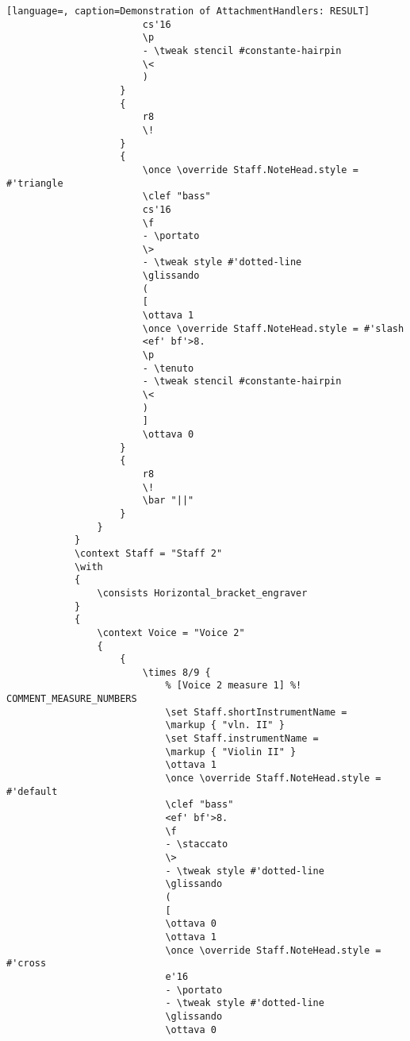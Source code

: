 \begin{lstlisting}[language=, caption=Demonstration of AttachmentHandlers: RESULT]
                        cs'16
                        \p
                        - \tweak stencil #constante-hairpin
                        \<
                        )
                    }
                    {
                        r8
                        \!
                    }
                    {
                        \once \override Staff.NoteHead.style = #'triangle
                        \clef "bass"
                        cs'16
                        \f
                        - \portato
                        \>
                        - \tweak style #'dotted-line
                        \glissando
                        (
                        [
                        \ottava 1
                        \once \override Staff.NoteHead.style = #'slash
                        <ef' bf'>8.
                        \p
                        - \tenuto
                        - \tweak stencil #constante-hairpin
                        \<
                        )
                        ]
                        \ottava 0
                    }
                    {
                        r8
                        \!
                        \bar "||"
                    }
                }
            }
            \context Staff = "Staff 2"
            \with
            {
                \consists Horizontal_bracket_engraver
            }
            {
                \context Voice = "Voice 2"
                {
                    {
                        \times 8/9 {
                            % [Voice 2 measure 1] %! COMMENT_MEASURE_NUMBERS
                            \set Staff.shortInstrumentName =
                            \markup { "vln. II" }
                            \set Staff.instrumentName =
                            \markup { "Violin II" }
                            \ottava 1
                            \once \override Staff.NoteHead.style = #'default
                            \clef "bass"
                            <ef' bf'>8.
                            \f
                            - \staccato
                            \>
                            - \tweak style #'dotted-line
                            \glissando
                            (
                            [
                            \ottava 0
                            \ottava 1
                            \once \override Staff.NoteHead.style = #'cross
                            e'16
                            - \portato
                            - \tweak style #'dotted-line
                            \glissando
                            \ottava 0

\end{lstlisting}
